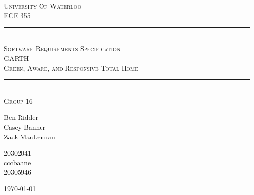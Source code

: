 \begin{titlepage}
\begin{center}
\vfill
\hfill
\\[2cm]
\textsc{\LARGE University Of Waterloo}
\\[1cm]
\textsc{\LARGE ECE 355}
\\[2cm]

\hrule
\hfill
\\[0.5cm]
\textsc{\huge Software Requirements Specification}
\\[0.5cm]
\textsc{\huge GARTH}
\\[0.5cm]
\textsc{\huge Green, Aware, and Responsive Total Home}
\\[0.5cm]
\hrule
\hfill
\\[1cm]
\textsc{\LARGE Group 16} \\[0.4cm]

\begin{minipage}{0.4\textwidth}
\begin{flushleft} \large
Ben Ridder \\
Casey Banner \\
Zack MacLennan
\end{flushleft}
\end{minipage}
\begin{minipage}{0.4\textwidth}
\begin{flushright} \large
20302041 \\
cccbanne \\
20305946 
\end{flushright}
\end{minipage}


\vfill

{\large \today}
\end{center}
\end{titlepage}
